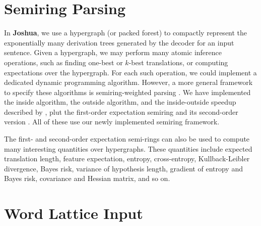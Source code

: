 \documentclass[11pt]{article}
\newcommand{\joshua}{\textbf{Joshua}\xspace}
\begin{document}
\section{Semiring Parsing}

In \joshua, we use a hypergraph (or packed forest) to compactly 
represent the exponentially many derivation trees generated by the decoder for an input sentence.
Given a hypergraph, we may perform many atomic inference operations,
such as finding one-best or $k$-best translations, or computing expectations over the hypergraph.
For each such operation, we could implement a dedicated dynamic programming algorithm.
However, a more general framework to specify these algorithms is semiring-weighted parsing \cite{semiringparsing}.
We have implemented  the inside algorithm, the outside algorithm, and the inside-outside speedup described by ,
plut the first-order expectation semiring \cite{eisner-expectation-semiring} and its
second-order version \cite{li-eisner:2009:EMNLP}.  All of these use our newly implemented semiring framework.


The first- and second-order expectation semi-rings can also be used to compute many interesting quantities over hypergraphs.
These quantities include expected translation length, feature expectation, entropy, cross-entropy, Kullback-Leibler divergence,
Bayes risk, variance of hypothesis length, gradient of entropy and Bayes risk, covariance and Hessian matrix, and so on.


\section{Word Lattice Input}
\end{document}
